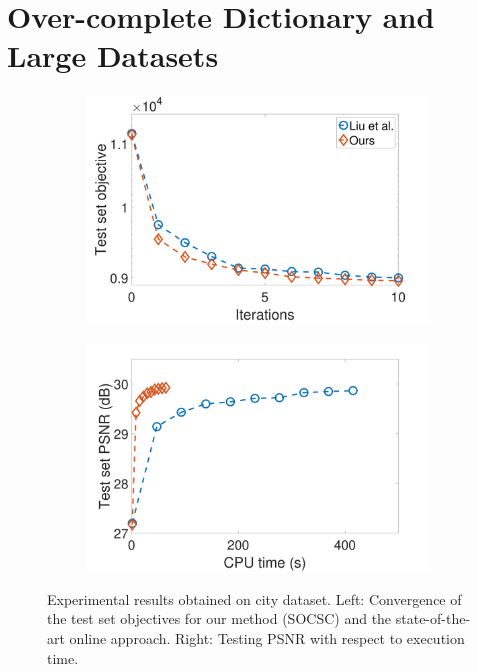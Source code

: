 \documentclass[10pt,twocolumn,letterpaper]{article}
\begin{document}
\section{Over-complete Dictionary and Large Datasets}
\begin{figure}[h]
\centering
\begin{subfigure}{0.49\textwidth}
  \includegraphics[width=1\linewidth]{figure/onlineVSliu-ite.pdf}
\end{subfigure}
\begin{subfigure}{0.49\textwidth}
  \includegraphics[width=1\linewidth]{figure/onlineVSliu-time.pdf}
\end{subfigure}

\caption{Experimental results obtained on city dataset. Left: Convergence of the test set objectives for our method (SOCSC) and the state-of-the-art online approach. Right: Testing PSNR with respect to execution time.}
\label{fig:onlineSmall-city}
\end{figure}
\end{document}
